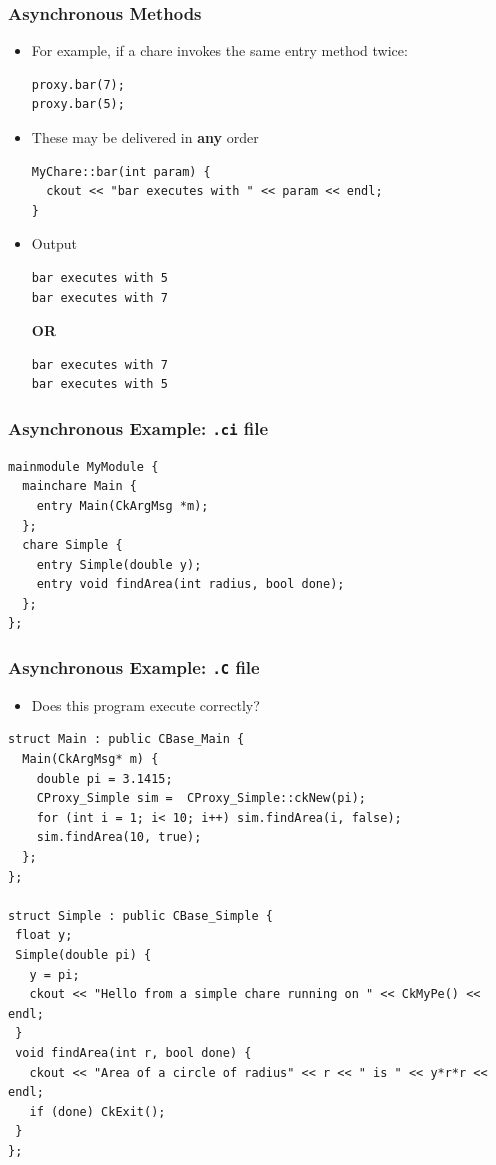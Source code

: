 \begin{frame}[fragile]
  \frametitle{Asynchronous Methods}
  \begin{itemize}
  \item For example, if a chare invokes the same entry method twice:
  \begin{lstlisting}
proxy.bar(7);
proxy.bar(5);
  \end{lstlisting}%
  \item These may be delivered in \textbf{any} order
  \begin{lstlisting}
MyChare::bar(int param) {
  ckout << "bar executes with " << param << endl;
}
\end{lstlisting}
  \item Output
\begin{lstlisting}
bar executes with 5
bar executes with 7
\end{lstlisting}
\textbf{OR}
\begin{lstlisting}
bar executes with 7
bar executes with 5
\end{lstlisting}
  \end{itemize}
\end{frame}


\begin{frame}[fragile]
  \frametitle{Asynchronous Example: \texttt{.ci} file}
\begin{lstlisting}
mainmodule MyModule {
  mainchare Main {
    entry Main(CkArgMsg *m);
  };
  chare Simple {
    entry Simple(double y);
    entry void findArea(int radius, bool done);
  };
};
\end{lstlisting}
\end{frame}

\begin{frame}[fragile]
  \frametitle{Asynchronous Example: \texttt{.C} file}
\begin{itemize}
  \item Does this program execute correctly?
\end{itemize}
\scriptsize
\begin{lstlisting}[basicstyle=\footnotesize]
struct Main : public CBase_Main {
  Main(CkArgMsg* m) {
    double pi = 3.1415;
    CProxy_Simple sim =  CProxy_Simple::ckNew(pi);
    for (int i = 1; i< 10; i++) sim.findArea(i, false);
    sim.findArea(10, true);
  };
};

struct Simple : public CBase_Simple {
 float y;
 Simple(double pi) {
   y = pi;
   ckout << "Hello from a simple chare running on " << CkMyPe() << endl;
 }
 void findArea(int r, bool done) {
   ckout << "Area of a circle of radius" << r << " is " << y*r*r << endl;
   if (done) CkExit();
 }
};
\end{lstlisting}
\end{frame}

